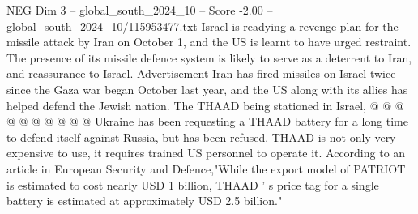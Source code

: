 \begin{textsample}{NEG Dim 3 – global\_south\_2024\_10 – Score -2.00 – global\_south\_2024\_10/115953477.txt}
Israel is readying a revenge plan for the missile attack by Iran on October 1, and the US is learnt to have urged restraint.
The presence of its missile defence system is likely to serve as a deterrent to Iran, and reassurance to Israel.
Advertisement Iran has fired missiles on Israel twice since the Gaza war began October last year, and the US along with its allies has helped defend the Jewish nation.
The THAAD being stationed in Israel, @ @ @ @ @ @ @ @ @ @ Ukraine has been requesting a THAAD battery for a long time to defend itself against Russia, but has been refused.
THAAD is not only very expensive to use, it requires trained US personnel to operate it.
According to an article in European Security and Defence,"While the export model of PATRIOT is estimated to cost nearly USD 1 billion, THAAD ' s price tag for a single battery is estimated at approximately USD 2.5 billion."

\end{textsample}
